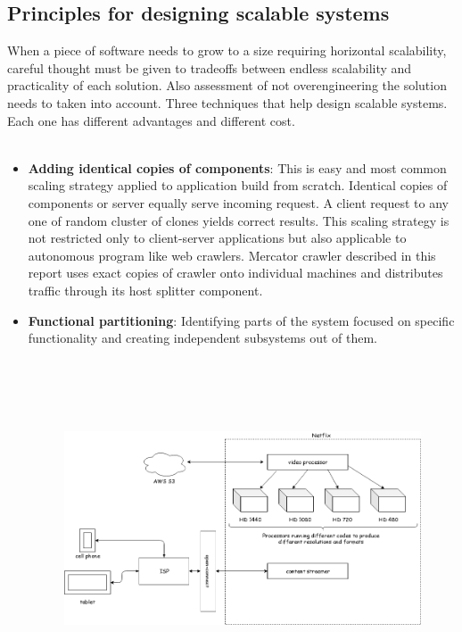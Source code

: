 \subsection{Principles for designing scalable systems}
When a piece of software needs to grow to a size requiring horizontal scalability, careful thought must
be given to tradeoffs between endless scalability and practicality of each solution. Also assessment of not
overengineering the solution needs to taken into account. Three techniques that help design scalable
systems. Each one has different advantages and different cost.
\\
\\
\begin{itemize}
\item \textbf{Adding identical copies of components}: This is easy and most common scaling strategy
  applied to application build from scratch. Identical copies of components or server equally serve
  incoming request. A client request to any one of random cluster of clones yields correct results.
  This scaling strategy is not restricted only to client-server applications but also applicable to
  autonomous program like web crawlers. Mercator crawler described in this report uses exact copies
  of crawler onto individual machines and distributes traffic through its host splitter component.
\item \textbf{Functional partitioning}: Identifying parts of the system focused on specific functionality
  and creating independent subsystems out of them.
  \begin{figure}[h!]
    \centering
    \includegraphics[width=13cm,height=10cm,keepaspectratio]{../media/crawler/netflix.png}

\end{figure}
\end{itemize}
